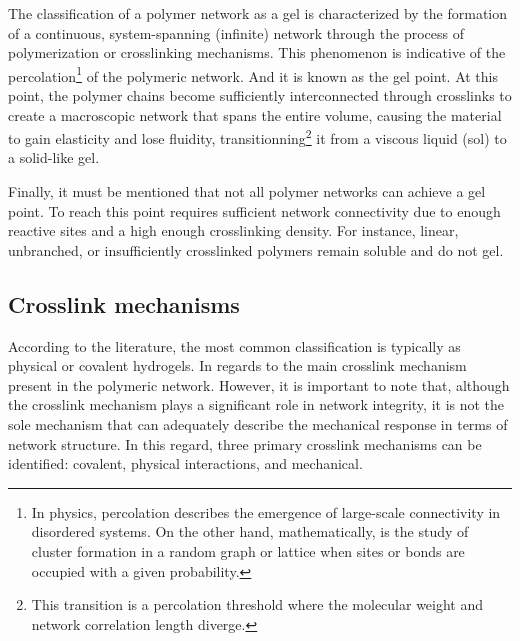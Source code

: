 The classification of a polymer network as a gel is characterized by the formation of a continuous, system-spanning (infinite) network through the process of polymerization or crosslinking mechanisms.
This phenomenon is indicative of the percolation\footnote{In physics, percolation describes the emergence of large-scale connectivity in disordered systems. On the other hand, mathematically, is the study of cluster formation in a random graph or lattice when sites or bonds are occupied with a given probability.} of the polymeric network.
And it is known as the gel point\citep{guPolymerNetworksPlastics2020}.
At this point, the polymer chains become sufficiently interconnected through crosslinks to create a macroscopic network that spans the entire volume, causing the material to gain elasticity and lose fluidity, transitionning\footnote{This transition is a percolation threshold where the molecular weight and network correlation length diverge.} it from a viscous liquid (sol) to a solid-like gel.

Finally, it must be mentioned that not all polymer networks can achieve a gel point.
To reach this point requires sufficient network connectivity due to enough reactive sites and a high enough crosslinking density.
For instance, linear, unbranched, or insufficiently crosslinked polymers remain soluble and do not gel.

\subsection{Crosslink mechanisms}

According to the literature, the most common classification is typically as physical or covalent hydrogels.
In regards to the main crosslink mechanism present in the polymeric network.
However, it is important to note that, although the crosslink mechanism plays a significant role in network integrity, it is not the sole mechanism that can adequately describe the mechanical response in terms of network structure.
In this regard, three primary crosslink mechanisms can be identified: covalent, physical interactions, and mechanical\citep{bustamantetorresHydrogelsClassificationAccording2021}.

